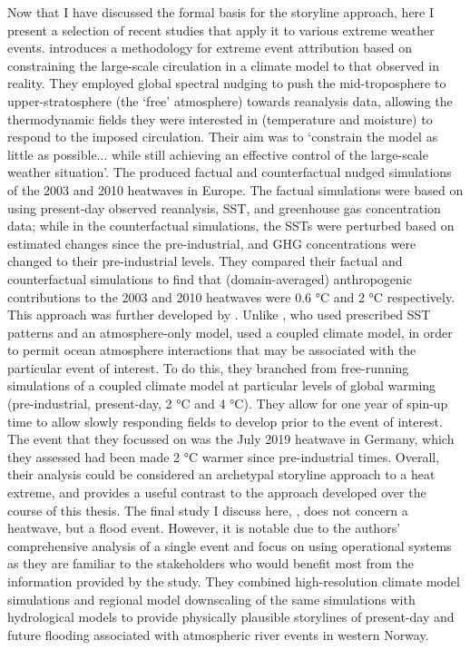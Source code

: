     Now that I have discussed the formal basis for the storyline approach, here I present a selection of recent studies that apply it to various extreme weather events. \citet{van_garderen_methodology_2021} introduces a methodology for extreme event attribution based on constraining the large-scale circulation in a climate model to that observed in reality. They employed global spectral nudging to push the mid-troposphere to upper-stratosphere (the `free' atmosphere) towards reanalysis data, allowing the thermodynamic fields they were interested in (temperature and moisture) to respond to the imposed circulation. Their aim was to `constrain the model as little as possible... while still achieving an effective control of the large-scale weather situation'. The produced factual and counterfactual nudged simulations of the 2003 and 2010 heatwaves in Europe. The factual simulations were based on using present-day observed reanalysis, SST, and greenhouse gas concentration data; while in the counterfactual simulations, the SSTs were perturbed based on estimated changes since the pre-industrial, and GHG concentrations were changed to their pre-industrial levels. They compared their factual and counterfactual simulations to find that (domain-averaged) anthropogenic contributions to the 2003 and 2010 heatwaves were 0.6 °C and 2 °C respectively. This approach was further developed by \citet{benitez_july_2022}. Unlike \citet{van_garderen_methodology_2021}, who used prescribed SST patterns and an atmosphere-only model, \citeauthor{benitez_july_2022} used a coupled climate model, in order to permit ocean atmosphere interactions that may be associated with the particular event of interest. To do this, they branched from free-running simulations of a coupled climate model at particular levels of global warming (pre-industrial, present-day, 2 °C and 4 °C). They allow for one year of spin-up time to allow slowly responding fields to develop prior to the event of interest. The event that they focussed on was the July 2019 heatwave in Germany, which they assessed had been made 2 °C warmer since pre-industrial times. Overall, their analysis could be considered an archetypal storyline approach to a heat extreme, and provides a useful contrast to the approach developed over the course of this thesis. The final study I discuss here, \citet{schaller_role_2020}, does not concern a heatwave, but a flood event. However, it is notable due to the authors' comprehensive analysis of a single event and focus on using operational systems as they are familiar to the stakeholders who would benefit most from the information provided by the study. They combined high-resolution climate model simulations and regional model downscaling of the same simulations with hydrological models to provide physically plausible storylines of present-day and future flooding associated with atmospheric river events in western Norway. 
    
